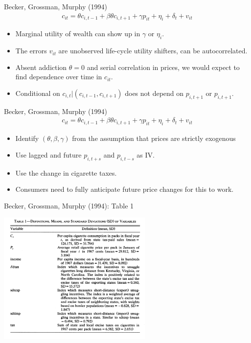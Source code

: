 \documentclass[xcolor=pdftex,dvipsnames,table,mathserif,aspectratio=169]{beamer}
\begin{document}
\begin{frame}{Becker, Grossman, Murphy (1994)}
\begin{align*}
c_{it} = \theta c_{i,t-1} +\beta \theta c_{i,t+1} + \gamma p_{it} + \eta_{i} + \delta_t + v_{it}
\end{align*}
\begin{itemize}
\item Marginal utility of wealth can show up in $\gamma$ or $\eta_i$.
\item The errors $v_{it}$ are unobserved life-cycle utility shifters, can be autocorrelated. 
\item Absent addiction $\theta=0$ and serial correlation in prices, we would expect to find dependence over time in $c_{it}$.
\item Conditional on $c_{i,t}| (c_{i,t-1},c_{i,t+1})$ does not depend on $p_{i,t+1}$ or $p_{i,t+1}$.
\end{itemize}
\end{frame}


\begin{frame}{Becker, Grossman, Murphy (1994)}
\begin{align*}
c_{it} = \theta c_{i,t-1} +\beta \theta c_{i,t+1} + \gamma p_{it} + \eta_{i} + \delta_t + v_{it}
\end{align*}
\begin{itemize}
\item Identify $(\theta,\beta,\gamma)$ from the assumption that prices are strictly exogenous
\item Use lagged and future $p_{i,t+s}$ and $p_{i,t-s}$ as IV. 
\item Use the change in cigarette taxes.
\item Consumers need to fully anticipate \alert{future price changes} for this to work.
\end{itemize}
\end{frame}

\begin{frame}{Becker, Grossman, Murphy (1994): Table 1}
\begin{center}
\includegraphics[width=3in]{./resources/gbm_t1.png}
\end{center}
\end{frame}
\end{document}
